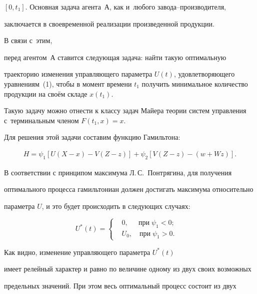 $[0, t_1]$. Основная задача агента~А, как и~любого завода--производителя,

заключается в своевременной реализации произведенной продукции.

В связи с~этим,

перед агентом~А ставится следующая задача:  найти такую оптимальную

траекторию изменения управляющего параметра $U(t)$, удовлетворяющего уравнениям~(1), чтобы в момент времени $t_1$ получить минимальное количество продукции на своём складе $x(t_1)$.

Такую задачу можно отнести к классу задач Майера теории систем управления с~терминальным членом $F(t_1, x)=x$.

Для решения этой задачи составим функцию Гамильтона:

\[

   \begin{aligned}

	H=\psi_1\left[U(X-x)-V(Z-z)\right]+\psi_2\left[V(Z-z)-(w+Wz)\right].

   \end{aligned}

\]



В соответствии с принципом максимума Л.\,С.~Понтрягина, для получения

оптимального процесса гамильтониан должен достигать максимума относительно

параметра $U$, и это будет происходить в следующих случаях:

\begin{equation}

\label{f7}

U^*(t)=\left \{ \begin{aligned} &

0, \quad \; \, \text{при} \; \psi_1 < 0; \\

& U_0, \quad \text{при} \;   \psi_1 > 0.

\end{aligned}

\right. \quad

\end{equation}



Как видно, изменение управляющего параметра $U^*(t)$

имеет релейный характер и равно по величине одному из двух своих возможных

предельных значений. При этом весь оптимальный процесс состоит из двух

